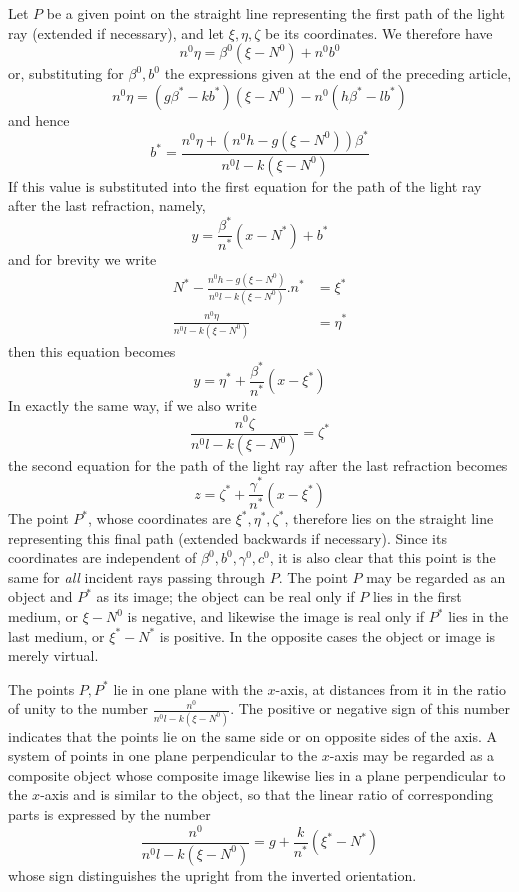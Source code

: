 Let $P$ be a given point on the straight line representing the first path of the light ray (extended if necessary), and let $\xi,\eta,\zeta$ be its coordinates. We therefore have
\[
n^0\eta=\beta^0(\xi-N^0)+n^0b^0
\]
or, substituting for $\beta^0,b^0$ the expressions given at the end of the preceding article,
\[
n^0\eta=(g\beta^*-kb^*)(\xi-N^0)-n^0(h\beta^*-lb^*)
\]
and hence
\[
b^*=\frac{n^0\eta+(n^0h-g(\xi-N^0))\beta^*}{n^0l-k(\xi-N^0)}
\]
If this value is substituted into the first equation for the path of the light ray after the last refraction, namely,
\[
y=\frac{\beta^*}{n^*}(x-N^*)+b^*
\]
and for brevity we write
\[
\begin{aligned}
N^*-\frac{n^0h-g(\xi-N^0)}{n^0l-k(\xi-N^0)}.n^*&=\xi^*\\
\frac{n^0\eta}{n^0l-k(\xi-N^0)}&=\eta^*
\end{aligned}
\]
then this equation becomes
\[
y=\eta^*+\frac{\beta^*}{n^*}(x-\xi^*)
\]
In exactly the same way, if we also write
\[
\frac{n^0\zeta}{n^0l-k(\xi-N^0)}=\zeta^*
\]
the second equation for the path of the light ray after the last refraction becomes
\[
z=\zeta^*+\frac{\gamma^*}{n^*}(x-\xi^*)
\]
The point $P^*$, whose coordinates are $\xi^*,\eta^*,\zeta^*$, therefore lies on the straight line representing this final path (extended backwards if necessary). Since its coordinates are independent of $\beta^0,b^0,\gamma^0,c^0$, it is also clear that this point is the same for \textit{all} incident rays passing through $P$. The point $P$ may be regarded as an object and $P^*$ as its image; the object can be real only if $P$ lies in the first medium, or $\xi-N^0$ is negative, and likewise the image is real only if $P^*$ lies in the last medium, or $\xi^*-N^*$ is positive. In the opposite cases the object or image is merely virtual.

The points $P,P^*$ lie in one plane with the $x$-axis, at distances from it in the ratio of unity to the number $\frac{n^0}{n^0l-k(\xi-N^0)}$. The positive or negative sign of this number indicates that the points lie on the same side or on opposite sides of the axis. A system of points in one plane perpendicular to the $x$-axis may be regarded as a composite object whose composite image likewise lies in a plane perpendicular to the $x$-axis and is similar to the object, so that the linear ratio of corresponding parts is expressed by the number
\[
\frac{n^0}{n^0l-k(\xi-N^0)}=g+\frac{k}{n^*}(\xi^*-N^*)
\]
whose sign distinguishes the upright from the inverted orientation.

